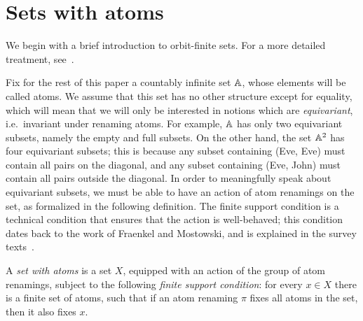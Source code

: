 \section{Sets with atoms}
We begin  with  a brief introduction to orbit-finite sets. For a more detailed treatment, see~\cite{bojanczyk_slightly2018}.

Fix for the rest of this paper a countably infinite set $\mathbb A$, whose elements will be called atoms.  We assume that this set has no other structure except for equality, which will mean that we will only be interested in notions which are \emph{equivariant}, i.e.~invariant under renaming atoms. For example, $\mathbb A$ has only two equivariant subsets, namely the empty and full subsets. On the other hand, the set $\mathbb A^2$ has four equivariant subsets; this is because any subset containing (Eve, Eve) must contain all pairs on the diagonal, and any subset containing (Eve, John) must contain all pairs outside the diagonal.  In order to meaningfully speak about equivariant subsets, we must be able to have an action of atom renamings on the set, as formalized in the following definition. The finite support condition is a technical condition that ensures that the action is well-behaved; this condition dates back to the work of Fraenkel and Mostowski, and is explained in the survey texts~\cite{PittsAM:nomsns,bojanczyk_slightly2018}.




\begin{definition}
    A \emph{set with atoms} is a set $X$, equipped with an action of the group of atom renamings, subject to the following \emph{finite support condition}: for every $x \in X$ there is a finite set of atoms, such that if an atom renaming $\pi$ fixes all atoms in the set, then it also fixes $x$.
\end{definition}

